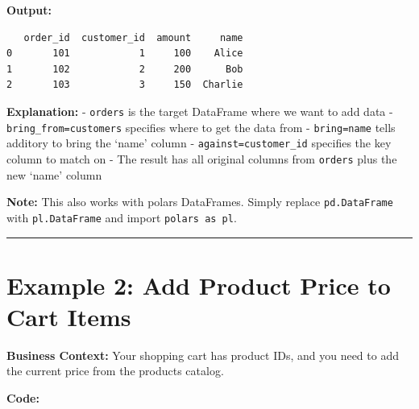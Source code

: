 \documentclass[
  letterpaper,
]{scrbook}
\begin{document}
\textbf{Output:}

\begin{verbatim}
   order_id  customer_id  amount     name
0       101            1     100    Alice
1       102            2     200      Bob
2       103            3     150  Charlie
\end{verbatim}

\textbf{Explanation:} - \texttt{orders} is the target DataFrame where we
want to add data - \texttt{bring\_from=customers} specifies where to get
the data from - \texttt{bring=\textquotesingle{}name\textquotesingle{}}
tells additory to bring the `name' column -
\texttt{against=\textquotesingle{}customer\_id\textquotesingle{}}
specifies the key column to match on - The result has all original
columns from \texttt{orders} plus the new `name' column

\textbf{Note:} This also works with polars DataFrames. Simply replace
\texttt{pd.DataFrame} with \texttt{pl.DataFrame} and import
\texttt{polars\ as\ pl}.

\begin{center}\rule{0.5\linewidth}{0.5pt}\end{center}

\section{Example 2: Add Product Price to Cart
Items}\label{example-2-add-product-price-to-cart-items}

\textbf{Business Context:} Your shopping cart has product IDs, and you
need to add the current price from the products catalog.

\textbf{Code:}
\end{document}

